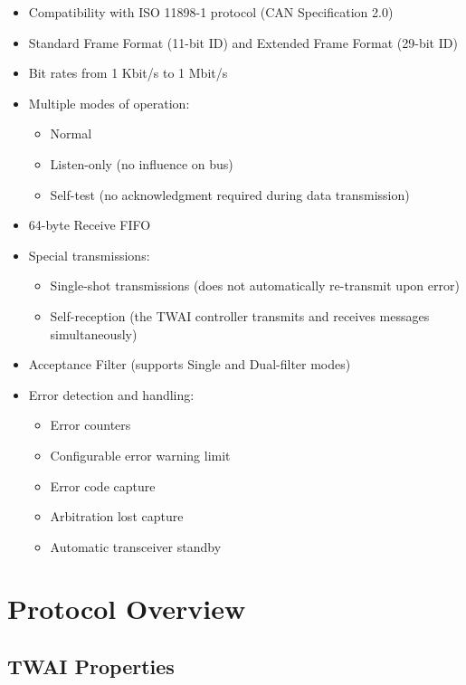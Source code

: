 \documentclass[main\_\_EN.tex]{subfiles}
\begin{document}
\begin{itemize}
    \item Compatibility with ISO 11898-1 protocol (CAN Specification 2.0)
    \item Standard Frame Format (11-bit ID) and Extended Frame Format (29-bit ID)
    \item Bit rates from 1 Kbit/s to 1 Mbit/s
    \item Multiple modes of operation:
    \begin{itemize}
        \item Normal
        \item Listen-only (no influence on bus)
        \item Self-test (no acknowledgment required during data transmission)
    \end{itemize}
    \item 64-byte Receive FIFO
    \item Special transmissions:
    \begin{itemize}
        \item Single-shot transmissions (does not automatically re-transmit upon error)
        \item Self-reception (the TWAI controller transmits and receives messages simultaneously)
    \end{itemize}
    \item Acceptance Filter (supports Single and Dual-filter modes)
    \item Error detection and handling:
    \begin{itemize}
        \item Error counters
        \item Configurable error warning limit
        \item Error code capture
        \item Arbitration lost capture
    \item Automatic transceiver standby
    \end{itemize}
\end{itemize}

\section{Protocol Overview}
\label{sec:twai-functional-protocol}

\subsection{TWAI Properties}
\end{document}

